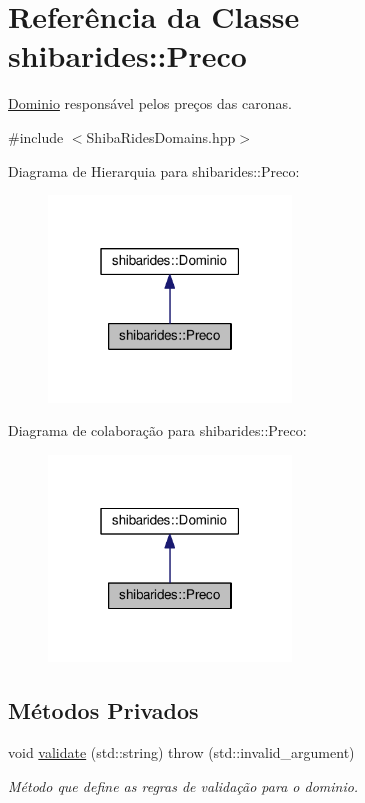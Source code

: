 \hypertarget{classshibarides_1_1Preco}{}\section{Referência da Classe shibarides\+:\+:Preco}
\label{classshibarides_1_1Preco}


\hyperlink{classshibarides_1_1Dominio}{Dominio} responsável pelos preços das caronas.  




{\ttfamily \#include $<$Shiba\+Rides\+Domains.\+hpp$>$}



Diagrama de Hierarquia para shibarides\+:\+:Preco\+:\nopagebreak
\begin{figure}[H]
\begin{center}
\leavevmode
\includegraphics[width=183pt]{classshibarides_1_1Preco__inherit__graph}
\end{center}
\end{figure}


Diagrama de colaboração para shibarides\+:\+:Preco\+:\nopagebreak
\begin{figure}[H]
\begin{center}
\leavevmode
\includegraphics[width=183pt]{classshibarides_1_1Preco__coll__graph}
\end{center}
\end{figure}
\subsection*{Métodos Privados}
\begin{DoxyCompactItemize}
\item 
void \hyperlink{classshibarides_1_1Preco_ae57d286adf4db4b1132001f8736892f7}{validate} (std\+::string)  throw (std\+::invalid\+\_\+argument)
\begin{DoxyCompactList}\small\item\em Método que define as regras de validação para o dominio. \end{DoxyCompactList}\end{DoxyCompactItemize}
